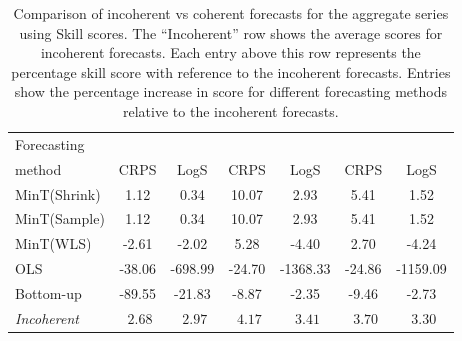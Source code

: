 \documentclass[a4paper, 11pt]{article}
\def\mathbi#1{\textit{ #1}}
\theoremstyle{theo}
\theoremstyle{definition}
\begin{document}
\begin{table}
  \caption{Comparison of incoherent vs coherent forecasts for the aggregate series using Skill scores. The ``Incoherent'' row shows the average scores for incoherent forecasts. Each entry above this row represents the percentage skill score with reference to the incoherent forecasts. Entries show the percentage increase in score for different forecasting methods relative to the incoherent forecasts.}\label{table:4}
  \centering\small
  \begin{tabular}{@{}lSSSSSS@{}}
    \toprule
    Forecasting &
     &
     &
     \\
    \cmidrule(lr){2-3} \cmidrule(lr){4-5} \cmidrule(l){6-7}
    method      &  CRPS   & LogS    & CRPS   & LogS     & CRPS   & LogS     \\
    \midrule
    MinT(Shrink) & 1.12   & 0.34    & 10.07  & 2.93     & 5.41   & 1.52     \\
    MinT(Sample) & 1.12   & 0.34    & 10.07  & 2.93     & 5.41   & 1.52     \\
    MinT(WLS)    & -2.61  & -2.02   & 5.28   & -4.40    & 2.70   & -4.24    \\
    OLS          & -38.06 & -698.99 & -24.70 & -1368.33 & -24.86 & -1159.09 \\
    Bottom-up    & -89.55 & -21.83  & -8.87  & -2.35    & -9.46  & -2.73    \\
    \midrule
    \textit{Incoherent} & $\mathbi{2.68}$ & $\mathbi{2.97}$ & $\mathbi{4.17}$ & $\mathbi{3.41}$ & $\mathbi{3.70}$ & $\mathbi{3.30}$ \\
    \bottomrule
  \end{tabular}
\end{table}
\end{document}
